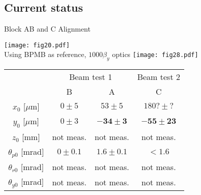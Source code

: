 \subsection{Current status}
Block AB and C Alignment\par
 \texttt{[image: fig20.pdf]}\\
{\tiny Using BPMB as reference,  $1000\beta_y$ optics}
 \texttt{[image: fig28.pdf]}\\
\begin{center}
 \begin{tabular}{|c||c|c|c|}\hline
 &\multicolumn{2}{|c|}{Beam test 1}& Beam test 2\\\cline{2-4}
 & B & A &C\\\hline\hline
$x_0$ [$\mu$m] & $0\pm5$ & $53\pm5$ &$180?\pm?$\\
$y_0$ [$\mu$m]& $0\pm3$ & $\boldsymbol{-34\pm3}$ &$\boldsymbol{-55\pm23}$\\
$z_0$ [mm]& not meas. & not meas. & not meas.\\
$\theta_{p0}$ [mrad]& $0\pm0.1$ & $\boldsymbol{1.6\pm0.1}$ & $\boldsymbol{<1.6}$\\
$\theta_{r0}$ [mrad]& not meas.&not meas.&not meas.\\
$\theta_{y0}$ [mrad]& not meas.&not meas.&not meas.\\\hline
\end{tabular}
\end{center}

